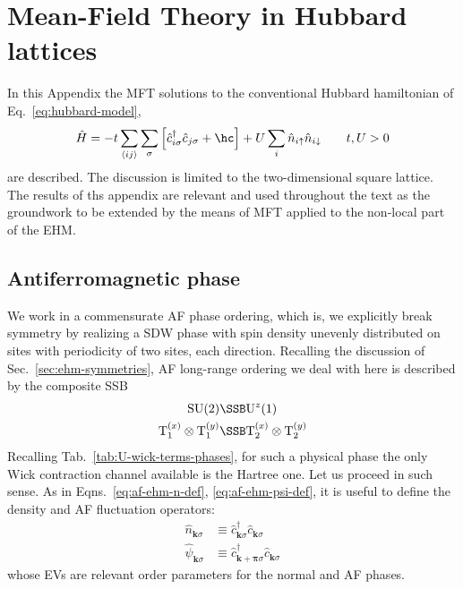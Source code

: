 \def\GraphicsFolder{appendices/mean-field-hubbard/pictures}
\chapter{Mean-Field Theory in Hubbard lattices}\label{appendix:mean-field-hubbard}

In this Appendix the MFT solutions to the conventional Hubbard hamiltonian of Eq.~\eqref{eq:hubbard-model},
\begin{equation}\label{appeq:hubbard-model}
	\hat H = 
	-t \sum_{\langle ij \rangle} \sum_\sigma \left[
		\hat c_{i\sigma}^\dagger \hat c_{j\sigma} + \hc
	\right]
	+ U \sum_i \hat n_{i\uparrow} \hat n_{i\downarrow}
	\qquad
	t, U  > 0
\end{equation}
are described. The discussion is limited to the two-dimensional square lattice. The results of ths appendix are relevant and used throughout the text as the groundwork to be extended by the means of MFT applied to the non-local part of the EHM.

%	

\section{Antiferromagnetic phase}\label{appsec:antiferromagnetic-phase}

We work in a commensurate AF phase ordering, which is, we explicitly break symmetry by realizing a SDW phase with spin density unevenly distributed on sites with periodicity of two sites, each direction. Recalling the discussion of Sec.~\ref{sec:ehm-symmetries}, AF long-range ordering we deal with here is described by the composite SSB
\[
\begin{aligned}
	\mathrm{SU}(2) &\SSB \mathrm{U}^z(1) \\
	\mathrm{T}_1^{(x)} \otimes \mathrm{T}_1^{(y)} &\SSB \mathrm{T}_2^{(x)} \otimes \mathrm{T}_2^{(y)}
\end{aligned}
\]
Recalling Tab.~\ref{tab:U-wick-terms-phases}, for such a physical phase the only Wick contraction channel available is the Hartree one. Let us proceed in such sense. As in Eqns.~\eqref{eq:af-ehm-n-def}, \eqref{eq:af-ehm-psi-def}, it is useful to define the density and AF fluctuation operators:
\begin{align}
	\hat n_{\mathbf{k}\sigma} &\equiv \hat c_{\mathbf{k}\sigma}^\dagger \hat c_{\mathbf{k}\sigma} \label{appeq:af-hm-n-def} \\
	\hat \psi_{\mathbf{k}\sigma} &\equiv \hat c_{\mathbf{k}+\bm{\pi}\sigma}^\dagger \hat c_{\mathbf{k}\sigma} \label{appeq:af-hm-psi-def}
\end{align}
whose EVs are relevant order parameters for the normal and AF phases. 

